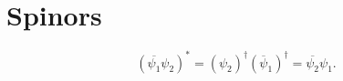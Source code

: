 \documentclass[CheatSheet]{subfiles}
\begin{document}
\changefontsizes{10pt}
\section{Spinors}

\changefontsizes{9pt}
\begin{equation}
 (\overline{\psi_1}\psi_2)^* = (\psi_2)^\dagger(\overline\psi_1)^\dagger = \overline{\psi_2}\psi_1.
\end{equation}
\end{document}

